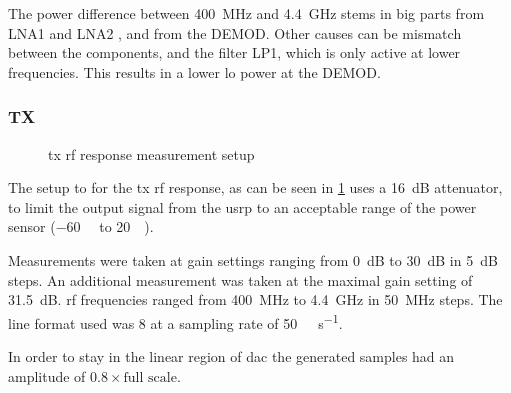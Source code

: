 \documentclass[12pt,a4paper,parskip=full,abstracton]{scrartcl}
\begin{document}
The power difference between \SI{400}{\mega\hertz} and \SI{4.4}{\giga\hertz}
stems in big parts from LNA1 and LNA2 \cite{rxlna}, and from the DEMOD. Other
causes can be mismatch between the components, and the filter LP1, which is only
active at lower frequencies. This results in a lower \gls{lo} power at the DEMOD.

\subsubsection{TX}
\label{sec:rftx}
\begin{figure}[htb]
    \centering
    \caption{\gls{tx} \gls{rf} response measurement setup}
    \label{fig:txrfsetup}
\end{figure}

The setup to for the \gls{tx} \gls{rf} response, as can be seen in 
\cref{fig:txrfsetup} uses a \SI{16}{\deci\bel} attenuator, to limit the output
signal from the \gls{usrp} to an acceptable range of the power sensor (\SI{-60}{\deci\belm}
to \SI{20}{\deci\belm}).

Measurements were taken at gain settings ranging from \SI{0}{\deci\bel} to \SI{30}{\deci\bel}
in \SI{5}{\deci\bel} steps. An additional measurement was taken at the maximal gain
setting of \SI{31.5}{\deci\bel}. \gls{rf} frequencies ranged from \SI{400}{\mega\hertz} to
\SI{4.4}{\giga\hertz} in \SI{50}{\mega\hertz} steps. The line format used was
\SI{8}{\bit} at a sampling rate of \SI{50}{\mega\samples\per\second}.

In order to stay in the linear region of \gls{dac} the generated samples had an amplitude
of $0.8 \times \text{full scale}$.
\end{document}
